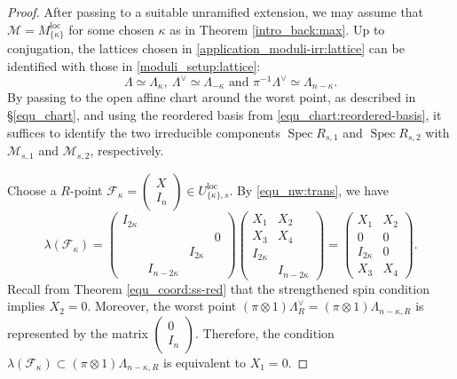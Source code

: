 \documentclass[pdflatex,sn-mathphys-num]{sn-jnl}%
\theoremstyle{thmstyleone}%
\theoremstyle{thmstyletwo}%
\numberwithin{equation}{subsection}
\theoremstyle{thmstylethree}%
\newcommand{\CF}{\ensuremath{\mathcal{F}}\xspace}
\newcommand{\CM}{\ensuremath{\mathcal{M}}\xspace}
\newcommand{\loc}{\ensuremath{\mathrm{loc}}\xspace}
\DeclareMathOperator{\Spec}{Spec}
\begin{document}
\begin{proof}
After passing to a suitable unramified extension, we may assume that $\CM=M^\loc_{\{\kappa\}}$ for some chosen $\kappa$ as in Theorem \ref{intro_back:max}. 
Up to conjugation, the lattices chosen in \eqref{application_moduli-irr:lattice} can be identified with those in \eqref{moduli_setup:lattice}:
\begin{equation*}
    \Lambda\simeq \Lambda_\kappa,\ 
    \Lambda^\vee\simeq \Lambda_{-\kappa}
    \text{ and }
    \pi^{-1}\Lambda^\vee\simeq \Lambda_{n-\kappa}.
\end{equation*}
By passing to the open affine chart around the worst point, as described in \S \ref{equ_chart}, and using the reordered basis from \eqref{equ_chart:reordered-basis}, it suffices to identify the two irreducible components $\Spec R_{s,1}$ and $\Spec R_{s,2}$ with $\CM_{s,1}$ and $\CM_{s,2}$, respectively.

Choose a $R$-point 
$\CF_\kappa=\left(\begin{matrix}
	X\\I_n
\end{matrix}\right)\in U_{\{\kappa\},s}^\loc$. By \eqref{equ_nw:trans}, we have
\begin{equation*}
    \lambda(\CF_\kappa)=
    \left(\begin{matrix}
	I_{2\kappa}    &          &          &   \\
	&          &          &   0\\
	&          &   I_{2\kappa}&   \\
	&   I_{n-2\kappa}  &          &   
\end{matrix}\right)
\left(\begin{matrix}
    X_1&X_2\\X_3&X_4\\I_{2\kappa}&\\&I_{n-2\kappa}
\end{matrix}\right)=
\left(\begin{matrix}
    X_1&X_2\\0&0\\I_{2\kappa}&0\\X_3&X_4
\end{matrix}\right).
\end{equation*}
Recall from Theorem \ref{equ_coord:ss-red} that the strengthened spin condition implies $X_2=0$.
Moreover, the worst point $(\pi\otimes 1)\Lambda^\vee_R=(\pi\otimes 1)\Lambda_{n-\kappa,R}$ is represented by the matrix $\left(\begin{matrix}
	0\\I_n
\end{matrix}\right)$.
Therefore, the condition $\lambda(\CF_\kappa)\subset (\pi\otimes 1)\Lambda_{n-\kappa,R}$ is equivalent to $X_1=0$.


\end{proof}
\end{document}
